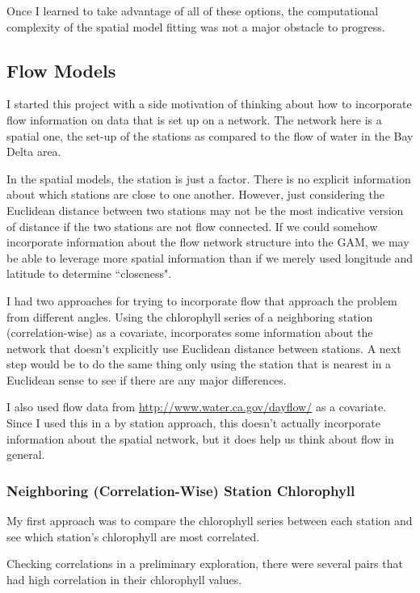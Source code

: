 \documentclass[12pt]{amsart}
\begin{document}
Once I learned to take advantage of all of these options, the computational complexity of the spatial model fitting was not a major obstacle to progress.

\subsection{Flow Models}

I started this project with a side motivation of thinking about how to incorporate flow information on data that is set up on a network. The network here is a spatial one, the set-up of the stations as compared to the flow of water in the Bay Delta area.

In the spatial models, the station is just a factor. There is no explicit information about which stations are close to one another. However, just considering the Euclidean distance between two stations may not be the most indicative version of distance if the two stations are not flow connected. If we could somehow incorporate information about the flow network structure into the GAM, we may be able to leverage more spatial information than if we merely used longitude and latitude to determine ``closeness".

I had two approaches for trying to incorporate flow that approach the problem from different angles. Using the chlorophyll series of a neighboring station (correlation-wise) as a covariate, incorporates some information about the network that doesn't explicitly use Euclidean distance between stations. A next step would be to do the same thing only using the station that is nearest in a Euclidean sense to see if there are any major differences.

I also used flow data from \url{http://www.water.ca.gov/dayflow/} as a covariate. Since I used this in a by station approach, this doesn't actually incorporate information about the spatial network, but it does help us think about flow in general. 



\subsubsection{Neighboring (Correlation-Wise) Station Chlorophyll}

My first approach was to compare the chlorophyll series between each station and see which station's chlorophyll are most correlated. 

Checking correlations in a preliminary exploration, there were several pairs that had high correlation in their chlorophyll values.
\end{document}

